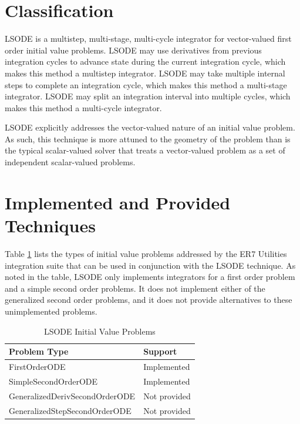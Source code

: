 \section{Classification}

LSODE is a multistep, multi-stage, multi-cycle
integrator for vector-valued first order initial value problems.
LSODE may use derivatives from previous integration cycles to advance
state during the current integration cycle,
which makes this method a multistep integrator.
LSODE may take multiple internal steps to complete an integration cycle,
which makes this method a multi-stage integrator.
LSODE may split an integration interval into multiple cycles,
which makes this method a multi-cycle integrator.

LSODE explicitly addresses the vector-valued nature of an initial value
problem.
As such, this technique is more attuned to the geometry of the problem than is
the typical scalar-valued solver that treats a vector-valued problem as a set
of independent scalar-valued problems.

\section{Implemented and Provided Techniques}

Table \ref{tab:lsode_method_problems} lists the types of initial value problems
addressed by the ER7 Utilities integration suite that can be used in
conjunction with the LSODE technique.
As noted in the table, LSODE only implements integrators for
a first order problem and a simple second order problems.
It does not implement either of the generalized second order problems,
and it does not provide alternatives to these unimplemented problems.


\begin{table}[htp]
\centering
\caption{LSODE Initial Value Problems}
\label{tab:lsode_method_problems}
\vspace{1ex}
\begin{tabular}{|l|l|}
\hline
\bf{Problem Type} & \bf{Support}
\\ \hline \hline
FirstOrderODE & Implemented \\
SimpleSecondOrderODE & Implemented \\
GeneralizedDerivSecondOrderODE & Not provided \\
GeneralizedStepSecondOrderODE & Not provided \\
\hline
\end{tabular}
\end{table}

